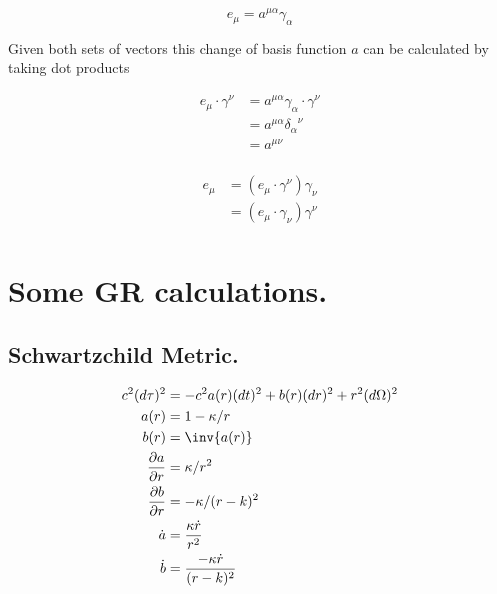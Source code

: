 \documentclass{article}      %
\newcommand{\PD}[2]{\frac{\partial {#2}}{\partial {#1}}}
\newcommand{\CC}[0]{c^2}
\newcommand{\adot}[0]{\dot{a}}
\newcommand{\bdot}[0]{\dot{b}}
\newcommand{\rdot}[0]{\dot{r}}
\begin{document}
\begin{equation*}
e_\mu = a^{\mu\alpha} \gamma_\alpha
\end{equation*}

Given both sets of vectors this change of basis function $a$ can be calculated by taking dot products

\begin{align*}
e_\mu \cdot \gamma^{\nu} 
&= a^{\mu\alpha} \gamma_\alpha \cdot \gamma^{\nu} \\
&= a^{\mu\alpha} {\delta_\alpha}^\nu \\
&= a^{\mu\nu} \\
\end{align*}

\begin{align}
e_\mu
&= \left(e_\mu \cdot \gamma^{\nu}\right) \gamma_\nu \\
&= \left(e_\mu \cdot \gamma_{\nu}\right) \gamma^\nu \\
\end{align}




%
%

\section{ Some GR calculations. }

\subsection{ Schwartzchild Metric. } 

\begin{align}
\CC (d\tau)^2 &= -\CC a(r) (dt)^2 + {b(r)} (dr)^2 + r^2(d\Omega)^2 \\
a(r) &= 1 - \kappa/r \\
b(r) &= \inv{a(r)} \\
\PD{r}{a} &= \kappa/r^2 \\
\PD{r}{b} &= -\kappa/(r-k)^2 \\
\adot &= \frac{\kappa \rdot}{r^2} \\
\bdot &= \frac{-\kappa \rdot}{(r-k)^2}
\end{align}
\end{document}
